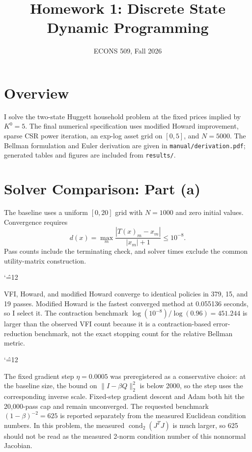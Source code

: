 \documentclass[11pt]{article}
\title{Homework 1: Discrete State Dynamic Programming}
\author{\reportauthor}
\date{ECONS 509, Fall 2026}
\newcommand{\resulttable}[3]{%
  \begin{table}[htbp]\centering
  \caption{#2}\label{#3}
  \begingroup\small\setlength{\tabcolsep}{4pt}
  \catcode`\^=12
  \sbox{\resultbox}{}
  \ifdim\wd\resultbox>\linewidth
    \resizebox{\linewidth}{!}{\usebox{\resultbox}}
  \else
    \usebox{\resultbox}
  \fi
  \endgroup
  \end{table}}
\begin{document}
\maketitle

\section{Overview}

I solve the two-state Huggett household problem at the fixed prices implied by
$K^0=5$. The final numerical specification uses modified Howard improvement,
sparse CSR power iteration, an exp-log asset grid on $[0,5]$, and $N=5000$.
The Bellman formulation and Euler derivation are given in
\texttt{manual/derivation.pdf}; generated tables and figures are included from
\texttt{results/}.

\section{Solver Comparison: Part (a)}

The baseline uses a uniform $[0,20]$ grid with $N=1000$ and zero initial values.
Convergence requires
\[
 d(x)=\max_m\frac{|T(x)_m-x_m|}{|x_m|+1}\leq10^{-8}.
\]
Pass counts include the terminating check, and solver times exclude the common
utility-matrix construction.

\resulttable{results/part_a_solvers.tex}
{Baseline solver comparison, $N=1000$ on $[0,20]$.}
{tab:solvers}

VFI, Howard, and modified Howard converge to identical policies in 379, 15,
and 19 passes. Modified Howard is the fastest converged method at 0.055136
seconds, so I select it. The contraction benchmark
$\log(10^{-8})/\log(0.96)=451.244$ is larger than the observed VFI count because
it is a contraction-based error-reduction benchmark, not the exact stopping
count for the relative Bellman metric.

\resulttable{results/part_a_theory_diagnostics.tex}
{Contraction and conditioning diagnostics, $J=I-\beta Q_G$.}
{tab:conditioning}

The fixed gradient step $\eta=0.0005$ was preregistered as a conservative choice:
at the baseline size, the bound on $\|I-\beta Q\|_2^2$ is below 2000, so the step
uses the corresponding inverse scale. Fixed-step gradient descent and Adam both
hit the 20,000-pass cap and remain unconverged. The requested benchmark
$(1-\beta)^{-2}=625$ is reported separately from the measured Euclidean
condition numbers. In this problem, the measured $\operatorname{cond}_2(J^TJ)$
is much larger, so 625 should not be read as the measured 2-norm condition
number of this nonnormal Jacobian.
\end{document}
